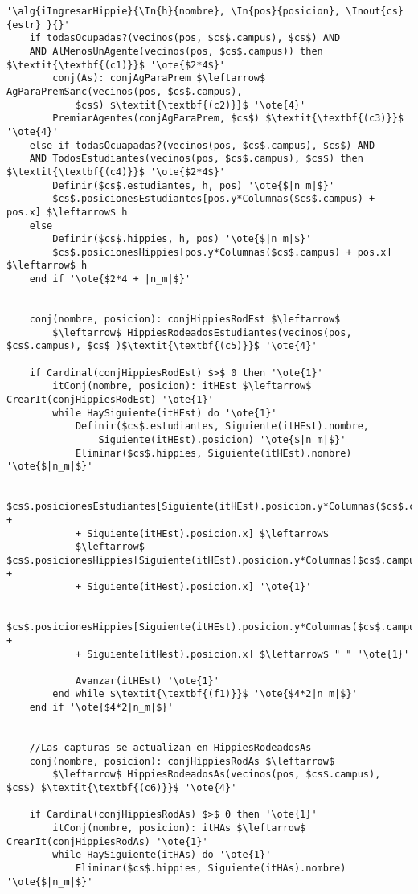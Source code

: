 \begin{lstlisting}[mathescape]
'\alg{iIngresarHippie}{\In{h}{nombre}, \In{pos}{posicion}, \Inout{cs}{estr} }{}'
	if todasOcupadas?(vecinos(pos, $cs$.campus), $cs$) AND
	AND AlMenosUnAgente(vecinos(pos, $cs$.campus)) then $\textit{\textbf{(c1)}}$ '\ote{$2*4$}'
		conj(As): conjAgParaPrem $\leftarrow$ AgParaPremSanc(vecinos(pos, $cs$.campus),
			$cs$) $\textit{\textbf{(c2)}}$ '\ote{4}'
		PremiarAgentes(conjAgParaPrem, $cs$) $\textit{\textbf{(c3)}}$ '\ote{4}'
	else if todasOcuapadas?(vecinos(pos, $cs$.campus), $cs$) AND
	AND TodosEstudiantes(vecinos(pos, $cs$.campus), $cs$) then $\textit{\textbf{(c4)}}$ '\ote{$2*4$}'
		Definir($cs$.estudiantes, h, pos) '\ote{$|n_m|$}'
		$cs$.posicionesEstudiantes[pos.y*Columnas($cs$.campus) + pos.x] $\leftarrow$ h
	else
		Definir($cs$.hippies, h, pos) '\ote{$|n_m|$}'
		$cs$.posicionesHippies[pos.y*Columnas($cs$.campus) + pos.x] $\leftarrow$ h
	end if '\ote{$2*4 + |n_m|$}'


	conj(nombre, posicion): conjHippiesRodEst $\leftarrow$
		$\leftarrow$ HippiesRodeadosEstudiantes(vecinos(pos, $cs$.campus), $cs$ )$\textit{\textbf{(c5)}}$ '\ote{4}'

	if Cardinal(conjHippiesRodEst) $>$ 0 then '\ote{1}'
		itConj(nombre, posicion): itHEst $\leftarrow$ CrearIt(conjHippiesRodEst) '\ote{1}'
		while HaySiguiente(itHEst) do '\ote{1}'
			Definir($cs$.estudiantes, Siguiente(itHEst).nombre,
				Siguiente(itHEst).posicion) '\ote{$|n_m|$}'
			Eliminar($cs$.hippies, Siguiente(itHEst).nombre) '\ote{$|n_m|$}'

			$cs$.posicionesEstudiantes[Siguiente(itHEst).posicion.y*Columnas($cs$.campus) +
			+ Siguiente(itHEst).posicion.x] $\leftarrow$
			$\leftarrow$ $cs$.posicionesHippies[Siguiente(itHEst).posicion.y*Columnas($cs$.campus) +
			+ Siguiente(itHest).posicion.x] '\ote{1}'

			$cs$.posicionesHippies[Siguiente(itHEst).posicion.y*Columnas($cs$.campus) +
			+ Siguiente(itHest).posicion.x] $\leftarrow$ " " '\ote{1}'

			Avanzar(itHEst) '\ote{1}'
		end while $\textit{\textbf{(f1)}}$ '\ote{$4*2|n_m|$}'
	end if '\ote{$4*2|n_m|$}'


	//Las capturas se actualizan en HippiesRodeadosAs
	conj(nombre, posicion): conjHippiesRodAs $\leftarrow$
		$\leftarrow$ HippiesRodeadosAs(vecinos(pos, $cs$.campus), $cs$) $\textit{\textbf{(c6)}}$ '\ote{4}'

	if Cardinal(conjHippiesRodAs) $>$ 0 then '\ote{1}'
		itConj(nombre, posicion): itHAs $\leftarrow$ CrearIt(conjHippiesRodAs) '\ote{1}'
		while HaySiguiente(itHAs) do '\ote{1}'
			Eliminar($cs$.hippies, Siguiente(itHAs).nombre) '\ote{$|n_m|$}'


\end{lstlisting}
